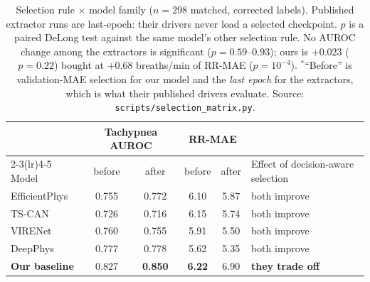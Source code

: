 \begin{table}[!t]
\caption{Selection rule $\times$ model family ($n{=}298$ matched, corrected labels). Published
extractor runs are last-epoch: their drivers never load a selected checkpoint. $p$ is a paired DeLong
test against the same model's other selection rule.
No AUROC change among the extractors is significant ($p=0.59$--$0.93$); ours is $+0.023$ ($p=0.22$) bought at $+0.68$ breaths/min of RR-MAE ($p=10^{-4}$). $^{*}$``Before'' is validation-MAE selection for our model and the \emph{last epoch} for the extractors, which is what their published drivers evaluate. Source: \texttt{scripts/selection\_matrix.py}.}
\label{tab:selmatrix}\centering\small
\begin{tabular}{@{}lccccl@{}}\toprule
 & \multicolumn{2}{c}{Tachypnea AUROC} & \multicolumn{2}{c}{RR-MAE} & \\
\cmidrule(lr){2-3}\cmidrule(lr){4-5}
Model & before & after & before & after & Effect of decision-aware selection\\\midrule
EfficientPhys & 0.755 & 0.772 & 6.10 & 5.87 & both improve\\
TS-CAN        & 0.726 & 0.716 & 6.15 & 5.74 & both improve\\
VIRENet       & 0.760 & 0.755 & 5.91 & 5.50 & both improve\\
DeepPhys      & 0.777 & 0.778 & 5.62 & 5.35 & both improve\\\midrule
\textbf{Our baseline}\rlap{$^{*}$} & 0.827 & \textbf{0.850} & \textbf{6.22} & 6.90 & \textbf{they trade off}\\
\bottomrule
\end{tabular}
\end{table}


